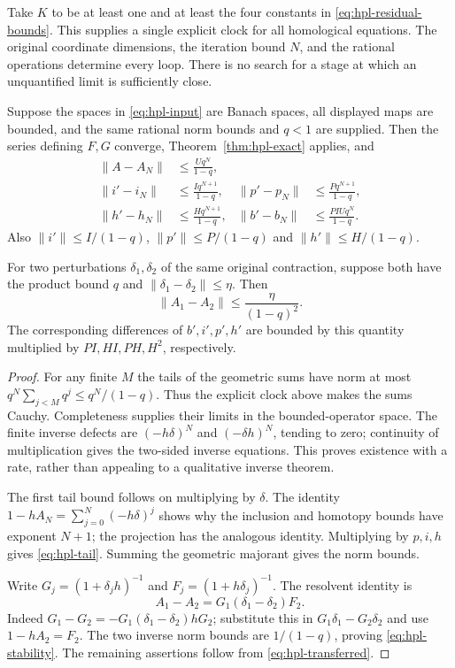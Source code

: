 Take $K$ to be at least one and at least the four constants in
\eqref{eq:hpl-residual-bounds}.  This supplies a single explicit clock for
all homological equations.  The original coordinate dimensions, the
iteration bound $N$, and the rational operations determine every loop.
There is no search for a stage at which an unquantified limit is sufficiently
close.

\begin{theorem}
\label{thm:hpl-banach}
Suppose the spaces in \eqref{eq:hpl-input} are Banach spaces, all displayed
maps are bounded, and the same rational norm bounds and $q<1$ are supplied.
Then the series defining $F,G$ converge, Theorem~\ref{thm:hpl-exact} applies,
and
\begin{align}
 \|A-A_N\|&\le\frac{Uq^N}{1-q},\\
 \|i'-i_N\|&\le\frac{Iq^{N+1}}{1-q},&
 \|p'-p_N\|&\le\frac{Pq^{N+1}}{1-q},\\
 \|h'-h_N\|&\le\frac{Hq^{N+1}}{1-q},&
 \|b'-b_N\|&\le\frac{PIUq^N}{1-q}.
 \label{eq:hpl-tail}
\end{align}
Also $\|i'\|\le I/(1-q)$, $\|p'\|\le P/(1-q)$ and
$\|h'\|\le H/(1-q)$.

For two perturbations $\delta_1,\delta_2$ of the same original contraction,
suppose both have the product bound $q$ and
$\|\delta_1-\delta_2\|\le\eta$.  Then
\begin{equation}
 \|A_1-A_2\|\le\frac{\eta}{(1-q)^2}.
 \label{eq:hpl-stability}
\end{equation}
The corresponding differences of $b',i',p',h'$ are bounded by this
quantity multiplied by $PI,HI,PH,H^2$, respectively.
\end{theorem}

\begin{proof}
For any finite $M$ the tails of the geometric sums have norm at most
$q^N\sum_{j<M}q^j\le q^N/(1-q)$.  Thus the explicit clock above makes
the sums Cauchy.  Completeness supplies their limits in the bounded-operator
space.  The finite inverse defects are $(-h\delta)^N$ and
$(-\delta h)^N$, tending to zero; continuity of multiplication gives the
two-sided inverse equations.  This proves existence with a rate, rather
than appealing to a qualitative inverse theorem.

The first tail bound follows on multiplying by $\delta$.  The identity
$1-hA_N=\sum_{j=0}^{N}(-h\delta)^j$ shows why the inclusion and homotopy
bounds have exponent $N+1$; the projection has the analogous identity.
Multiplying by $p,i,h$ gives \eqref{eq:hpl-tail}.  Summing the geometric
majorant gives the norm bounds.

Write $G_j=(1+\delta_jh)^{-1}$ and $F_j=(1+h\delta_j)^{-1}$.
The resolvent identity is
\[
 A_1-A_2=G_1(\delta_1-\delta_2)F_2.
\]
Indeed $G_1-G_2=-G_1(\delta_1-\delta_2)hG_2$; substitute this in
$G_1\delta_1-G_2\delta_2$ and use $1-hA_2=F_2$.
The two inverse norm bounds are $1/(1-q)$, proving
\eqref{eq:hpl-stability}.  The remaining assertions follow from
\eqref{eq:hpl-transferred}.
\end{proof}

